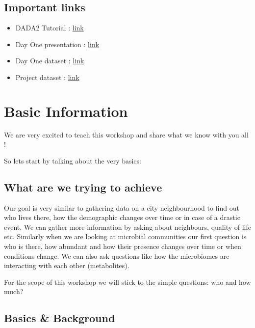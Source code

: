 \documentclass[
]{book}
\providecommand{\tightlist}{%
  \setlength{\itemsep}{0pt}\setlength{\parskip}{0pt}}
\begin{document}
\hypertarget{important-links}{%
\section{Important links}\label{important-links}}

\begin{itemize}
\tightlist
\item
  DADA2 Tutorial : \href{http://benjjneb.github.io/dada2/tutorial.html}{link}
\item
  Day One presentation : \href{new_microbiomeworkshop.pdf}{link}
\item
  Day One dataset : \href{MiSeqSOPData.zip}{link}
\item
  Project dataset : \href{https://www.dropbox.com/sh/qra6ohbsyt1icaz/AAACvlNjUhfkbkGIp_1KA2uCa?dl=0}{link}
\end{itemize}

\hypertarget{basic-information}{%
\chapter{Basic Information}\label{basic-information}}

We are very excited to teach this workshop and share what we know with you all !

So lets start by talking about the very basics:

\hypertarget{what-are-we-trying-to-achieve}{%
\section{What are we trying to achieve}\label{what-are-we-trying-to-achieve}}

Our goal is very similar to gathering data on a city neighbourhood to find out who lives there, how the demographic changes over time or in case of a drastic event. We can gather more information by asking about neighbours, quality of life etc. Similarly when we are looking at microbial communities our first question is who is there, how abundant and how their presence changes over time or when conditions change. We can also ask questions like how the microbiomes are interacting with each other (metabolites).

For the scope of this workshop we will stick to the simple questions: who and how much?

\hypertarget{basics-background}{%
\section{Basics \& Background}\label{basics-background}}
\end{document}
